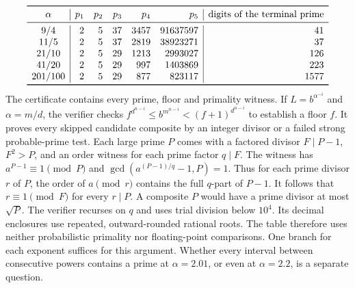 \[
\begin{array}{c|rrrrr|r}
\toprule
\alpha &p_1&p_2&p_3&p_4&p_5& \text{digits of the terminal prime}\\
\midrule
9/4&2&5&37&3457&91637597&41\\
11/5&2&5&37&2819&38923271&37\\
21/10&2&5&29&1213&2993027&126\\
41/20&2&5&29&997&1403869&223\\
201/100&2&5&29&877&823117&1577\\
\bottomrule
\end{array}
\]
The certificate contains every prime, floor and primality witness. If $L=b^{\alpha^{-i}}$ and $\alpha=m/d$, the verifier checks
$f^{d^{n-i}}\le b^{m^{n-i}}<(f+1)^{d^{n-i}}$ to establish a floor $f$. It proves every skipped candidate composite by an integer divisor or a failed strong probable-prime test. Each large prime $P$ comes with a factored divisor $F\mid P-1$, $F^2>P$, and an order witness for each prime factor $q\mid F$. The witness has $a^{P-1}\equiv1\pmod P$ and $\gcd(a^{(P-1)/q}-1,P)=1$. Thus for each prime divisor $r$ of $P$, the order of $a\pmod r$ contains the full $q$-part of $P-1$. It follows that $r\equiv1\pmod F$ for every $r\mid P$. A composite $P$ would have a prime divisor at most $\sqrt P$. The verifier recurses on $q$ and uses trial division below $10^4$. Its decimal enclosures use repeated, outward-rounded rational roots. The table therefore uses neither probabilistic primality nor floating-point comparisons. One branch for each exponent suffices for this argument. Whether every interval between consecutive powers contains a prime at $\alpha=2.01$, or even at $\alpha=2.2$, is a separate question.
